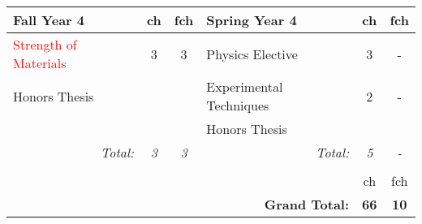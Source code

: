 \documentclass[12pt,preprint]{aastex}
\newcommand{\red}[1]{\textcolor{red}{#1}}
\begin{document}
\begin{longtable}{lcclcc}
\hline
{\bf Fall Year 4} & {\sc ch} & {\sc fch} & {\bf Spring Year 4} & {\sc ch} & {\sc fch} \\ 
\hline
\hline
\red{Strength of Materials} & 3 & 3 & Physics Elective & 3 & - \\
Honors Thesis               &   &   & Experimental Techniques    & 2 & - \\
                            &   &   & Honors Thesis    &  &  \\
\multicolumn{1}{r}{\emph{Total:}} & \emph{3} & \emph{3} &
\multicolumn{1}{r}{\emph{Total:}} & \emph{5} & \emph{-} \\
\hline \\
 &   &   &  & {\sc ch} & {\sc fch} \\  
 &   &   & \multicolumn{1}{r}{{\bf Grand Total:}} & {\bf 66} & {\bf 10} \\  
\end{longtable}


%
 



 
%
%
%

\end{document}
